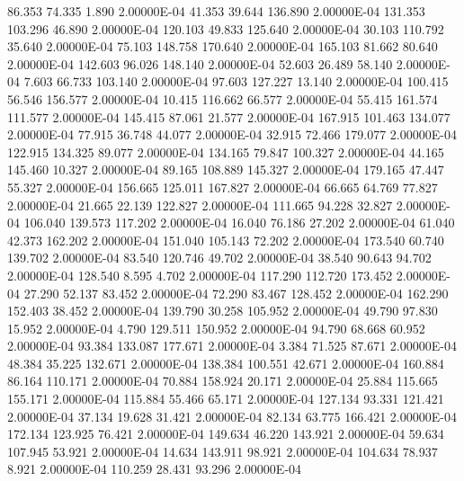     86.353    74.335     1.890  2.00000E-04
    41.353    39.644   136.890  2.00000E-04
   131.353   103.296    46.890  2.00000E-04
   120.103    49.833   125.640  2.00000E-04
    30.103   110.792    35.640  2.00000E-04
    75.103   148.758   170.640  2.00000E-04
   165.103    81.662    80.640  2.00000E-04
   142.603    96.026   148.140  2.00000E-04
    52.603    26.489    58.140  2.00000E-04
     7.603    66.733   103.140  2.00000E-04
    97.603   127.227    13.140  2.00000E-04
   100.415    56.546   156.577  2.00000E-04
    10.415   116.662    66.577  2.00000E-04
    55.415   161.574   111.577  2.00000E-04
   145.415    87.061    21.577  2.00000E-04
   167.915   101.463   134.077  2.00000E-04
    77.915    36.748    44.077  2.00000E-04
    32.915    72.466   179.077  2.00000E-04
   122.915   134.325    89.077  2.00000E-04
   134.165    79.847   100.327  2.00000E-04
    44.165   145.460    10.327  2.00000E-04
    89.165   108.889   145.327  2.00000E-04
   179.165    47.447    55.327  2.00000E-04
   156.665   125.011   167.827  2.00000E-04
    66.665    64.769    77.827  2.00000E-04
    21.665    22.139   122.827  2.00000E-04
   111.665    94.228    32.827  2.00000E-04
   106.040   139.573   117.202  2.00000E-04
    16.040    76.186    27.202  2.00000E-04
    61.040    42.373   162.202  2.00000E-04
   151.040   105.143    72.202  2.00000E-04
   173.540    60.740   139.702  2.00000E-04
    83.540   120.746    49.702  2.00000E-04
    38.540    90.643    94.702  2.00000E-04
   128.540     8.595     4.702  2.00000E-04
   117.290   112.720   173.452  2.00000E-04
    27.290    52.137    83.452  2.00000E-04
    72.290    83.467   128.452  2.00000E-04
   162.290   152.403    38.452  2.00000E-04
   139.790    30.258   105.952  2.00000E-04
    49.790    97.830    15.952  2.00000E-04
     4.790   129.511   150.952  2.00000E-04
    94.790    68.668    60.952  2.00000E-04
    93.384   133.087   177.671  2.00000E-04
     3.384    71.525    87.671  2.00000E-04
    48.384    35.225   132.671  2.00000E-04
   138.384   100.551    42.671  2.00000E-04
   160.884    86.164   110.171  2.00000E-04
    70.884   158.924    20.171  2.00000E-04
    25.884   115.665   155.171  2.00000E-04
   115.884    55.466    65.171  2.00000E-04
   127.134    93.331   121.421  2.00000E-04
    37.134    19.628    31.421  2.00000E-04
    82.134    63.775   166.421  2.00000E-04
   172.134   123.925    76.421  2.00000E-04
   149.634    46.220   143.921  2.00000E-04
    59.634   107.945    53.921  2.00000E-04
    14.634   143.911    98.921  2.00000E-04
   104.634    78.937     8.921  2.00000E-04
   110.259    28.431    93.296  2.00000E-04
